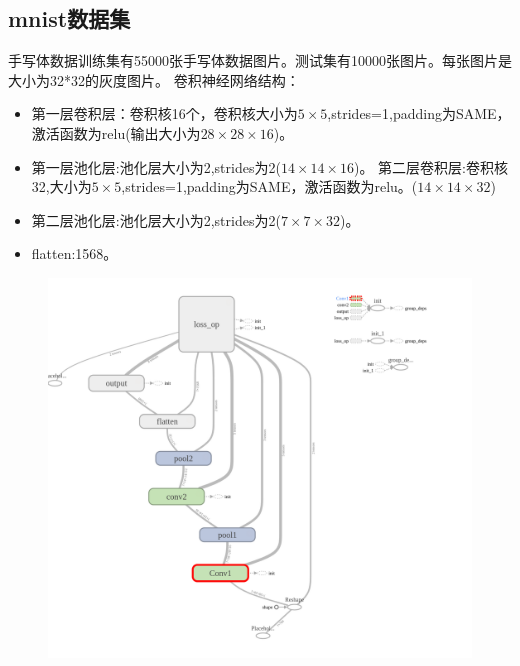 \subsection{mnist数据集}
手写体数据训练集有55000张手写体数据图片。测试集有10000张图片。每张图片是大小为32*32的灰度图片。
卷积神经网络结构：
\begin{itemize}
	\item 第一层卷积层：卷积核16个，卷积核大小为$5\times5$,strides=1,padding为SAME，激活函数为relu(输出大小为$28\times28\times16$)。
	\item 第一层池化层:池化层大小为2,strides为2($14\times14\times16$)。
第二层卷积层:卷积核32,大小为$5\times5$,strides=1,padding为SAME，激活函数为relu。($14\times14\times32$)
	\item 第二层池化层:池化层大小为2,strides为2($7\times7\times32$)。
	\item flatten:1568。
\end{itemize}
\begin{figure}[H]
	\includegraphics[scale=0.4]{./pic/chapter1/mnist_cnn.png}
\end{figure}

